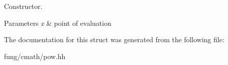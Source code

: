 Constructor. 


\begin{DoxyParams}{Parameters}
{\em x} & point of evaluation \\
\hline
\end{DoxyParams}


The documentation for this struct was generated from the following file\-:\begin{DoxyCompactItemize}
\item 
fung/cmath/pow.\-hh\end{DoxyCompactItemize}
